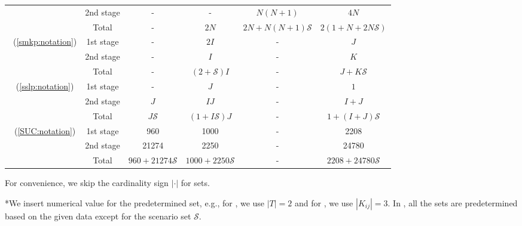 \begin{table}[H]
{\begin{threeparttable}
\begin{tabular}{@{}cccccc@{}}
				& 2nd stage & -              & -                                  & $N(N+1)$              & $4N$                     \\ \cmidrule(l){2-6} 
				& Total          & -              & $2N$                               & $2N+N(N+1)\mathcal{S}$ & $2(1+N+2N\mathcal{S})$    \\ \midrule
				\multirow{3}{*}{\smkp\ (\ref{smkp:notation})}   & 1st stage & -              & $2I$                               & -                    & $J$                       \\
				& 2nd stage & -              & $I$                                & -                    & $K$                       \\ \cmidrule(l){2-6} 
				& Total          & -              & $(2+\mathcal{S})I$                 & -                    & $J+K\mathcal{S}$          \\ \midrule
				\multirow{3}{*}{\sslp\ (\ref{sslp:notation})}   & 1st stage & -              & $J$                                & -                    & $1$                       \\
				& 2nd stage & $J$            & $IJ$                               & -                    & $I+J$                     \\ \cmidrule(l){2-6} 
				& Total          & $J\mathcal{S}$ & $(1+I\mathcal{S})J$                & -                    & $1+(I+J)\mathcal{S}$      \\ \midrule
				\multirow{3}{*}{\suc\ (\ref{SUC:notation})}   & 1st stage & 960               &   1000                                 &     -                 &  2208                         \\
				& 2nd stage & 21274               &     2250                               &   -                   & 24780                          \\ \cmidrule(l){2-6} 
				& Total          & $960+21274\mathcal{S}$                &  $1000+2250\mathcal{S}$                                  &  -                    &  $2208+24780\mathcal{S}$                         \\ \bottomrule
			\end{tabular}
			
			\begin{tablenotes}
				\small
				\item *For convenience, we skip the cardinality sign $|\cdot|$ for sets.
				\item **We insert numerical value for the predetermined set, e.g., for \sizes, we use $|T|=2$ and for \mptsps, we use $|K_{ij}|=3$. In \suc, all the sets are predetermined based on the given data except for the scenario set $\mathcal{S}$.
			\end{tablenotes}
		\end{threeparttable}
	}
\end{table}

